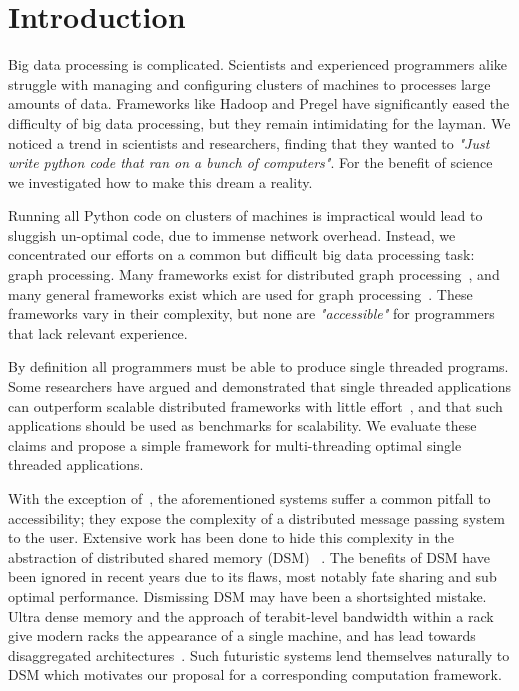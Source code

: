 \section{Introduction}
\label{sec:intro}

Big data processing is complicated. Scientists and experienced 
programmers alike struggle with managing and configuring
clusters of machines to processes large amounts of data. Frameworks
like Hadoop and Pregel have significantly eased the difficulty of big
data processing, but they remain intimidating for the layman. We
noticed a trend in scientists and researchers, finding that they
wanted to \textit{"Just write python code that ran on a bunch of
computers"}. For the benefit of science we investigated how to make
this dream a reality.

Running all Python code on clusters of machines is impractical would lead to sluggish un-optimal code, due to immense network overhead. Instead,
we concentrated our efforts on a common but difficult big data
processing task: graph processing. Many frameworks exist for
distributed graph
processing~\cite{Malewicz:2010:PSL:1807167.1807184,Ching:2015:OTE:2824032.2824077,Kyrola:2012:GLG:2387880.2387884,Low:2012:DGF:2212351.2212354,Xin:2013:GRD:2484425.2484427,Gonzalez:2012:PDG:2387880.2387883},
and many general frameworks exist which are used for graph
processing~\cite{Vavilapalli:2013:AHY:2523616.2523633,Zaharia:2012:RDD:2228298.2228301,Isard:2007:DDD:1272996.1273005,Murray:2013:NTD:2517349.2522738}.
These frameworks vary in their complexity, but none are
\textit{"accessible"} for programmers that lack relevant experience.

By definition all programmers must be able to produce single threaded
programs. Some researchers have argued and demonstrated that single
threaded applications can outperform scalable distributed frameworks
with little effort~\cite{189908}, and that such applications should be
used as benchmarks for scalability. We evaluate these claims and
propose a simple framework for multi-threading optimal single threaded
applications.

With the exception of~\cite{Kyrola:2012:GLG:2387880.2387884}, the
aforementioned systems suffer a common pitfall to accessibility; they
expose the complexity of a distributed message passing system to the
user. Extensive work has been done to hide this complexity in the
abstraction of distributed shared memory (DSM)
~\cite{Keleher:1994:TDS:1267074.1267084,Power:2010:PBF:1924943.1924964,Morin:2004:KDP:1111682.1111729,Haddad:2001:MCL:374794.374800,Huang06vodca:view-oriented}.
The benefits of DSM have been ignored in recent years due to its flaws,
most notably fate sharing and sub optimal performance. Dismissing DSM may 
have been a shortsighted mistake. Ultra dense memory and the
approach of terabit-level bandwidth within a rack give modern racks the
appearance of a single machine, and has lead towards disaggregated
architectures~\cite{facebook-rack,machine,intel-rsa,seamicro,Han:2013:NSR:2535771.2535778}.
Such futuristic systems lend themselves naturally to DSM which
motivates our proposal for a corresponding computation framework.

